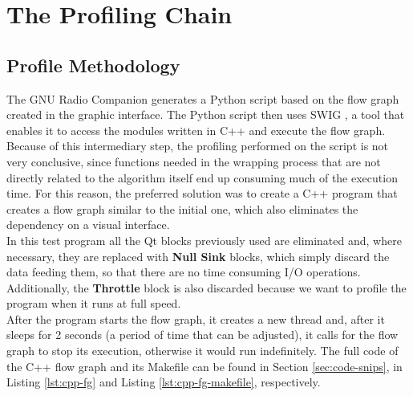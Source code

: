 
\section{The Profiling Chain}
\label{sec:profiling-chain}
\subsection{Profile Methodology}

The GNU Radio Companion generates a Python script based on the flow graph
created in the graphic interface. The Python script then uses SWIG
\cite{cite:swig}, a tool that enables it to access the modules written in C++
and execute the flow graph.  Because of this intermediary step, the profiling
performed on the script is not very conclusive, since functions needed in the
wrapping process that are not directly related to the algorithm itself end up
consuming much of the execution time. For this reason, the preferred solution
was to create a C++ program that creates a flow graph similar to the initial
one, which also eliminates the dependency on a visual interface. \\

In this test program all the Qt blocks previously used are eliminated and, where
necessary, they are replaced with \textbf{Null Sink} blocks, which simply
discard the data feeding them, so that there are no time consuming I/O
operations. Additionally, the \textbf{Throttle} block is also discarded because
we want to profile the program when it runs at full speed. \\

After the program starts the flow graph, it creates a new thread and, after it
sleeps for 2 seconds (a period of time that can be adjusted), it calls for the
flow graph to stop its execution, otherwise it would run indefinitely. The full
code of the C++ flow graph and its Makefile can be found in Section
\ref{sec:code-snips}, in Listing \ref{lst:cpp-fg} and Listing
\ref{lst:cpp-fg-makefile}, respectively. \\


